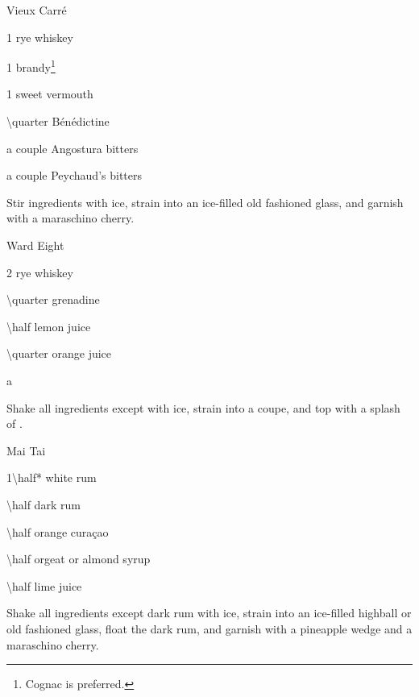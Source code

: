 \begin{Cocktail}{Vieux Carr\'e}
	\begin{Ingredients}
	\item \SI{1}{\oz} rye whiskey
	\item \SI{1}{\oz} brandy\footnote{Cognac is preferred.}
	\item \SI{1}{\oz} sweet vermouth
	\item \SI{\quarter}{\oz} B\'en\'edictine
	\item a couple \si{\dashes} Angostura bitters
	\item a couple \si{\dashes} Peychaud's bitters
	\end{Ingredients}
	
	\begin{Instructions}
	Stir ingredients with ice, strain into an ice-filled old fashioned glass, and garnish with a maraschino cherry.
	\end{Instructions}
\end{Cocktail}

\begin{Cocktail}{Ward Eight}
	\begin{Ingredients}
	\item \SI{2}{\oz} rye whiskey
	\item \SI{\quarter}{\oz} grenadine
	\item \SI{\half}{\oz} lemon juice
	\item \SI{\quarter}{\oz} orange juice
	\item a \si{\splash} \soda\/
	\end{Ingredients}
	
	\begin{Instructions}
	Shake all ingredients except \soda\/ with ice, strain into a coupe, and top with a splash of \soda\/.
	\end{Instructions}
\end{Cocktail}

\begin{Cocktail}{Mai Tai}
	\begin{Ingredients}
	\item \SI{1\half*}{\oz} white rum
	\item \SI{\half}{\oz} dark rum
	\item \SI{\half}{\oz} orange cura\c{c}ao
	\item \SI{\half}{\oz} orgeat or almond syrup
	\item \SI{\half}{\oz} lime juice
	\end{Ingredients}
	
	\begin{Instructions}
	Shake all ingredients except dark rum with ice, strain into an ice-filled highball or old fashioned glass, float the dark rum, and garnish with a pineapple wedge and a maraschino cherry.
	\end{Instructions}
\end{Cocktail}

